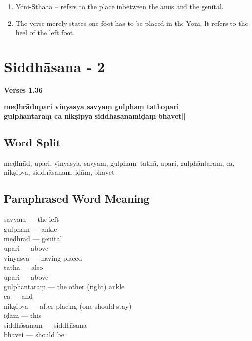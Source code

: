 \begin{enumerate}
\item Yoni-Sthana – refers to the place inbetween the anus and the genital. 
\item The verse merely states one foot has to be placed in the Yoni. It refers to the heel of the left foot. 
\end{enumerate}
\newpage

\section*{Siddhāsana - 2}

\noindent 
\textbf{Verses 1.36}

\begin{shloka}
\textbf{meḍhrādupari vinyasya savyaṃ gulphaṃ tathopari|}\\
\textbf{gulphāntaraṃ ca nikṣipya siddhāsanamiḍāṃ bhavet||}
\end{shloka}

\subsection*{Word Split}

meḍhrād, upari, vinyasya, savyam, gulpham, tathā, upari, gulphāntaram, ca, nikṣipya, siddhāsanam, iḍām, bhavet

\subsection*{Paraphrased Word Meaning}

\begin{multicols}{2}
savyaṃ --- the left  \\
gulphaṃ --- ankle  \\
meḍhrād --- genital  \\ 
upari ---  above  \\
vinyasya --- having placed  \\
tatha --- also  \\
upari --- above  \\
gulphāntaraṃ --- the other (right) ankle  \\
ca --- and  \\
nikṣipya ---  after placing (one should stay) \\
iḍāṃ --- this \\
siddhāsanam --- siddhāsana \\
bhavet ---  should be
\end{multicols}
  
